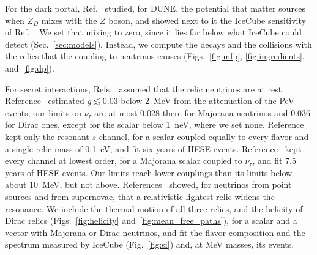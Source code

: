 \documentclass[linenumbers, aps, prd, twocolumn, superscriptaddress, floatfix, longbibliography, nofootinbib, bibnotes]{revtex4-2}
\begin{document}
For the dark portal, Ref.~\cite{Jana:2026pwx} studied, for DUNE, the potential that matter sources when $Z_D$ mixes with the $Z$ boson, and showed next to it the IceCube sensitivity of Ref.~\cite{Agarwalla:2023sng}.
We set that mixing to zero, since it lies far below what IceCube could detect (Sec.~\ref{sec:models}).
Instead, we compute the decays and the collisions with the relics that the coupling to neutrinos causes (Figs.~\ref{fig:mfp}, \ref{fig:ingredients}, and~\ref{fig:dp}).

For secret interactions, Refs.~\cite{Ng:2014pca, Ioka:2014kca, Bustamante:2020mep, Esteban:2021tub} assumed that the relic neutrinos are at rest.
Reference~\cite{Ioka:2014kca} estimated $g \lesssim 0.03$ below 2~MeV from the attenuation of the PeV events; our limits on $\nu_\tau$ are at most 0.028 there for Majorana neutrinos and 0.036 for Dirac ones, except for the scalar below 1~neV, where we set none.
Reference~\cite{Bustamante:2020mep} kept only the resonant $s$ channel, for a scalar coupled equally to every flavor and a single relic mass of 0.1~eV, and fit six years of HESE events.
Reference~\cite{Esteban:2021tub} kept every channel at lowest order, for a Majorana scalar coupled to $\nu_\tau$, and fit 7.5 years of HESE events.
Our limits reach lower couplings than its limits below about 10~MeV, but not above.
References~\cite{Doring:2023vmk, Wang:2025qap} showed, for neutrinos from point sources and from supernovae, that a relativistic lightest relic widens the resonance.
We include the thermal motion of all three relics, and the helicity of Dirac relics (Figs.~\ref{fig:helicity} and~\ref{fig:mean_free_paths}), for a scalar and a vector with Majorana or Dirac neutrinos, and fit the flavor composition and the spectrum measured by IceCube (Fig.~\ref{fig:si}) and, at MeV masses, its events.
\end{document}
